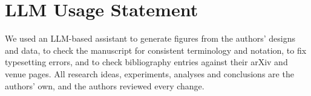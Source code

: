 \section*{LLM Usage Statement}
We used an LLM-based assistant to generate figures from the authors' designs and data, to
check the manuscript for consistent terminology and notation, to fix typesetting errors, and
to check bibliography entries against their arXiv and venue pages. All research ideas,
experiments, analyses and conclusions are the authors' own, and the authors reviewed every
change.
